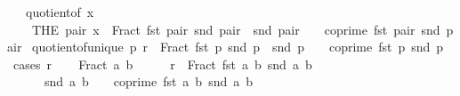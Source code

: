 \begin{isabellebody}
\ \ \ {\isachardoublequoteopen}quotient{\isacharunderscore}{\kern0pt}of\ x\ {\isacharequal}{\kern0pt}\isanewline
\ \ \ \ {\isacharparenleft}{\kern0pt}THE\ pair{\isachardot}{\kern0pt}\ x\ {\isacharequal}{\kern0pt}\ Fract\ {\isacharparenleft}{\kern0pt}fst\ pair{\isacharparenright}{\kern0pt}\ {\isacharparenleft}{\kern0pt}snd\ pair{\isacharparenright}{\kern0pt}\ {\isasymand}\ snd\ pair\ {\isachargreater}{\kern0pt}\ {}\ {\isasymand}\ coprime\ {\isacharparenleft}{\kern0pt}fst\ pair{\isacharparenright}{\kern0pt}\ {\isacharparenleft}{\kern0pt}snd\ pair{\isacharparenright}{\kern0pt}{\isacharparenright}{\kern0pt}{\isachardoublequoteclose}\isanewline
\isanewline
{}\isamarkupfalse%
\ quotient{\isacharunderscore}{\kern0pt}of{\isacharunderscore}{\kern0pt}unique{\isacharcolon}{\kern0pt}\ {\isachardoublequoteopen}{\isasymexists}{\isacharbang}{\kern0pt}p{\isachardot}{\kern0pt}\ r\ {\isacharequal}{\kern0pt}\ Fract\ {\isacharparenleft}{\kern0pt}fst\ p{\isacharparenright}{\kern0pt}\ {\isacharparenleft}{\kern0pt}snd\ p{\isacharparenright}{\kern0pt}\ {\isasymand}\ snd\ p\ {\isachargreater}{\kern0pt}\ {}\ {\isasymand}\ coprime\ {\isacharparenleft}{\kern0pt}fst\ p{\isacharparenright}{\kern0pt}\ {\isacharparenleft}{\kern0pt}snd\ p{\isacharparenright}{\kern0pt}{\isachardoublequoteclose}\isanewline
%
\isadelimproof
%
\endisadelimproof
%
\isatagproof
{}\isamarkupfalse%
\ {\isacharparenleft}{\kern0pt}cases\ r{\isacharparenright}{\kern0pt}\isanewline
\ \ \isamarkupfalse%
\ {\isacharparenleft}{\kern0pt}Fract\ a\ b{\isacharparenright}{\kern0pt}\isanewline
\ \ \isamarkupfalse%
\ \isamarkupfalse%
\ {\isachardoublequoteopen}r\ {\isacharequal}{\kern0pt}\ Fract\ {\isacharparenleft}{\kern0pt}fst\ {\isacharparenleft}{\kern0pt}a{\isacharcomma}{\kern0pt}\ b{\isacharparenright}{\kern0pt}{\isacharparenright}{\kern0pt}\ {\isacharparenleft}{\kern0pt}snd\ {\isacharparenleft}{\kern0pt}a{\isacharcomma}{\kern0pt}\ b{\isacharparenright}{\kern0pt}{\isacharparenright}{\kern0pt}\ {\isasymand}\isanewline
\ \ \ \ \ \ snd\ {\isacharparenleft}{\kern0pt}a{\isacharcomma}{\kern0pt}\ b{\isacharparenright}{\kern0pt}\ {\isachargreater}{\kern0pt}\ {}\ {\isasymand}\ coprime\ {\isacharparenleft}{\kern0pt}fst\ {\isacharparenleft}{\kern0pt}a{\isacharcomma}{\kern0pt}\ b{\isacharparenright}{\kern0pt}{\isacharparenright}{\kern0pt}\ {\isacharparenleft}{\kern0pt}snd\ {\isacharparenleft}{\kern0pt}a{\isacharcomma}{\kern0pt}\ b{\isacharparenright}{\kern0pt}{\isacharparenright}{\kern0pt}{\isachardoublequoteclose}\isanewline

\end{isabellebody}
